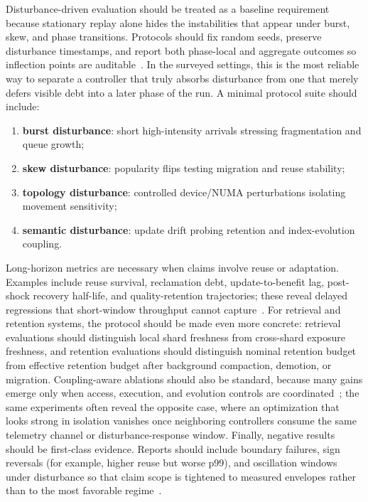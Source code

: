 \documentclass[acmsmall,screen,review]{acmart}
\begin{document}
Disturbance-driven evaluation should be treated as a baseline requirement because stationary replay alone hides the instabilities that appear under burst, skew, and phase transitions. Protocols should fix random seeds, preserve disturbance timestamps, and report both phase-local and aggregate outcomes so inflection points are auditable~\cite{zhang2019briskstream,zhang2020concurrent}. In the surveyed settings, this is the most reliable way to separate a controller that truly absorbs disturbance from one that merely defers visible debt into a later phase of the run. A minimal protocol suite should include:
\begin{enumerate}[leftmargin=*]
\item \textbf{burst disturbance}: short high-intensity arrivals stressing fragmentation and queue growth;
\item \textbf{skew disturbance}: popularity flips testing migration and reuse stability;
\item \textbf{topology disturbance}: controlled device/NUMA perturbations isolating movement sensitivity;
\item \textbf{semantic disturbance}: update drift probing retention and index-evolution coupling.
\end{enumerate}

Long-horizon metrics are necessary when claims involve reuse or adaptation. Examples include reuse survival, reclamation debt, update-to-benefit lag, post-shock recovery half-life, and quality-retention trajectories; these reveal delayed regressions that short-window throughput cannot capture~\cite{kwon2023pagedattention,zhou2025ferret,zhang2026flowrag}. For retrieval and retention systems, the protocol should be made even more concrete: retrieval evaluations should distinguish local shard freshness from cross-shard exposure freshness, and retention evaluations should distinguish nominal retention budget from effective retention budget after background compaction, demotion, or migration. Coupling-aware ablations should also be standard, because many gains emerge only when access, execution, and evolution controls are coordinated~\cite{mao2023morphstream,zeng2024cstream,zeng2024pecj}; the same experiments often reveal the opposite case, where an optimization that looks strong in isolation vanishes once neighboring controllers consume the same telemetry channel or disturbance-response window. Finally, negative results should be first-class evidence. Reports should include boundary failures, sign reversals (for example, higher reuse but worse p99), and oscillation windows under disturbance so that claim scope is tightened to measured envelopes rather than to the most favorable regime~\cite{zhang2020concurrent,zeng2024pecj,wu2023sentistream}.
\end{document}
